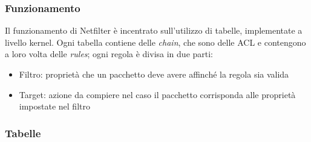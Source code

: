 \subsubsection{Funzionamento}

\noindent Il funzionamento di Netfilter è incentrato sull'utilizzo di tabelle, 
implementate a livello kernel. Ogni tabella contiene delle \textit{chain}, che 
sono delle ACL e contengono a loro volta delle \textit{rules}; ogni regola è divisa in 
due parti:
\begin{itemize}
    \item Filtro: proprietà che un pacchetto deve avere affinché la regola sia valida
    \item Target: azione da compiere nel caso il pacchetto corrisponda alle proprietà impostate 
    nel filtro
\end{itemize}

\subsubsection{Tabelle}

